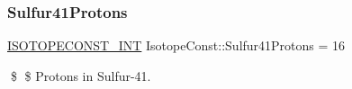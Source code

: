 \subsubsection{\texorpdfstring{Sulfur41\+Protons}{Sulfur41Protons}}
{\footnotesize\ttfamily \mbox{\hyperlink{group___isotope_const-_macros_ga5f18360b3e99483a35c32d789e62621c}{I\+S\+O\+T\+O\+P\+E\+C\+O\+N\+S\+T\+\_\+\+I\+NT}} Isotope\+Const\+::\+Sulfur41\+Protons = 16}

\$ \$ Protons in Sulfur-\/41. 